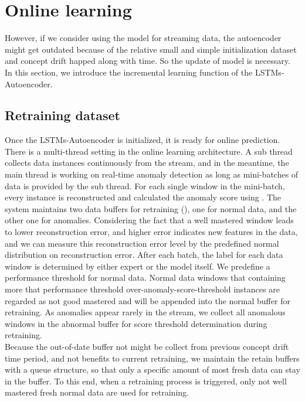 \section{Online learning}
\label{sec:Onlinelearning}
However, if we consider using the model for streaming data, the autoencoder might get outdated because of the relative small and simple initialization dataset and concept drift happed along with time. So the update of model is necessary. In this section, we introduce the incremental learning function of the LSTMs-Autoencoder.

\subsection{Retraining dataset}
\label{data}

Once the LSTMs-Autoencoder is initialized, it is ready for online prediction. There is a multi-thread setting in the online learning architecture. A sub thread collects data instances continuously from the stream, and in the meantime, the main thread is working on real-time anomaly detection as long as mini-batches of data is provided by the sub thread. For each single window in the mini-batch, every instance is reconstructed and calculated the anomaly score using . The system maintains two data buffers for retraining (), one for normal data, and the other one for anomalies. Considering the fact that a well mastered window leads to lower reconstruction error, and higher error indicates new features in the data, and we can measure this reconstruction error level by the predefined normal distribution on reconstruction error. After each batch, the label for each data window is determined by either expert or the model itself. We predefine a performance threshold for normal data. Normal data windows that containing more that performance threshold over-anomaly-score-threshold instances are regarded as not good mastered and will be appended into the normal buffer for retraining. As anomalies appear rarely in the stream, we collect all anomalous windows in the abnormal buffer for score threshold determination during retraining. \\

Because the out-of-date buffer not might be collect from previous concept drift time period, and not benefits to current retraining, we maintain the retain buffers with a queue structure, so that only a specific amount of most fresh data can stay in the buffer. To this end, when a retraining process is triggered, only not well mastered fresh normal data are used for retraining.


